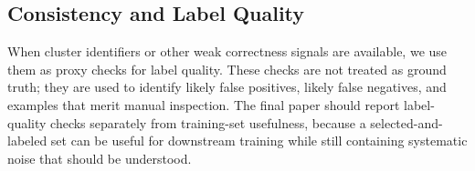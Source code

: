 \subsection{Consistency and Label Quality}

When cluster identifiers or other weak correctness signals are available, we use them as proxy checks for label quality. These checks are not treated as ground truth; they are used to identify likely false positives, likely false negatives, and examples that merit manual inspection. The final paper should report label-quality checks separately from training-set usefulness, because a selected-and-labeled set can be useful for downstream training while still containing systematic noise that should be understood.

